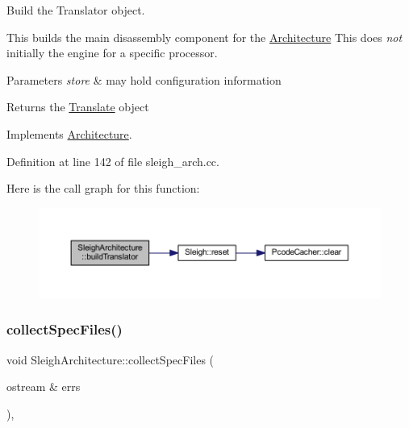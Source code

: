 Build the Translator object. 

This builds the main disassembly component for the \mbox{\hyperlink{class_architecture}{Architecture}} This does {\itshape not} initially the engine for a specific processor. 
\begin{DoxyParams}{Parameters}
{\em store} & may hold configuration information \\
\hline
\end{DoxyParams}
\begin{DoxyReturn}{Returns}
the \mbox{\hyperlink{class_translate}{Translate}} object 
\end{DoxyReturn}


Implements \mbox{\hyperlink{class_architecture_ab951056481cac3e73770db9d567d5212}{Architecture}}.



Definition at line 142 of file sleigh\+\_\+arch.\+cc.

Here is the call graph for this function\+:
\nopagebreak
\begin{figure}[H]
\begin{center}
\leavevmode
\includegraphics[width=350pt]{class_sleigh_architecture_aae195ea2828d13b6e15d16c722d14b18_cgraph}
\end{center}
\end{figure}
\mbox{\label{class_sleigh_architecture_ac037ef568059275e73b9be91f0612ef3}} 
\subsubsection{\texorpdfstring{collectSpecFiles()}{collectSpecFiles()}}
{\footnotesize\ttfamily void Sleigh\+Architecture\+::collect\+Spec\+Files (\begin{DoxyParamCaption}\item[{ostream \&}]{errs }\end{DoxyParamCaption})\hspace{0.3cm}{\ttfamily [static]}, {\ttfamily [protected]}}



